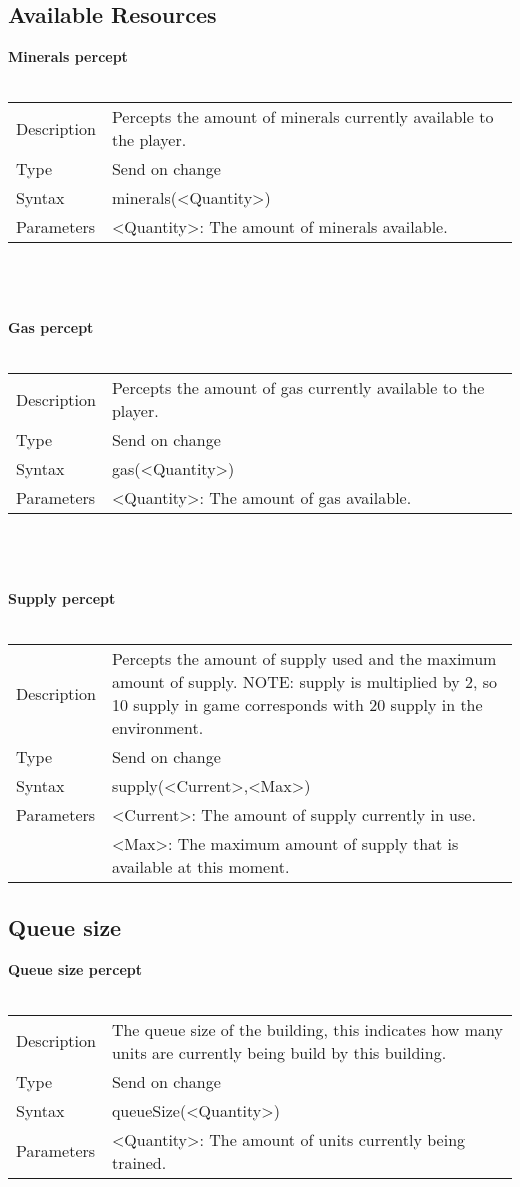 \documentclass[english,11pt]{report}
\begin{document}
\subsection{Available Resources}
\textbf{Minerals percept}\\
\\
\begin{tabularx}{\textwidth}{lX}
 Description & Percepts the amount of minerals currently available to the player. \\
 Type & Send on change \\
 Syntax & minerals(<Quantity>) \\
 Parameters &   <Quantity>: The amount of minerals available.
\end{tabularx}\\
\\
\\
\textbf{Gas percept}\\
\\
\begin{tabularx}{\textwidth}{lX}
 Description & Percepts the amount of gas currently available to the player. \\
 Type & Send on change \\
 Syntax & gas(<Quantity>) \\
 Parameters &   <Quantity>: The amount of gas available.
\end{tabularx}\\
\\
\\
\textbf{Supply percept}\\
\\
\begin{tabularx}{\textwidth}{lX}
 Description & Percepts the amount of supply used and the maximum amount of supply. NOTE: supply is multiplied by 2, so 10 supply in game corresponds with 20 supply in the environment. \\
 Type & Send on change \\
 Syntax & supply(<Current>,<Max>) \\
 Parameters &   <Current>: The amount of supply currently in use.\\
            &   <Max>: The maximum amount of supply that is available at this moment.
\end{tabularx}

\newpage
\subsection{Queue size}
\textbf{Queue size percept}\\
\\
\begin{tabularx}{\textwidth}{lX}
 Description & The queue size of the building, this indicates how many units are currently being build by this building. \\
 Type & Send on change \\
 Syntax & queueSize(<Quantity>) \\
 Parameters &   <Quantity>: The amount of units currently being trained.
\end{tabularx}
\end{document}

